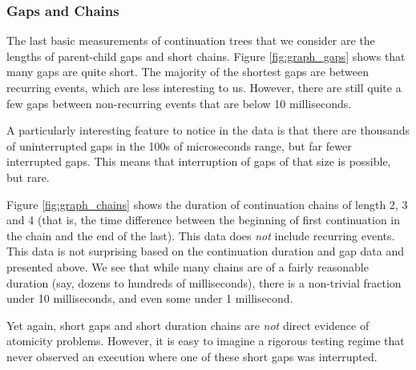 \documentclass[acmsmall,anonymous,review]{acmart}\settopmatter{printfolios=true,printccs=false,printacmref=false}
\begin{document}
\subsubsection{Gaps and Chains}

The last basic measurements of continuation trees that we consider are the lengths of parent-child gaps and short chains.
Figure \ref{fig:graph_gaps} shows that many gaps are quite short.
The majority of the shortest gaps are between recurring events, which are less interesting to us.
However, there are still quite a few gaps between non-recurring events that are below 10 milliseconds.

A particularly interesting feature to notice in the data is that there are thousands of uninterrupted gaps in the 100s of microseconds range, but far fewer interrupted gaps.
This means that interruption of gaps of that size is possible, but rare.

Figure \ref{fig:graph_chains} shows the duration of continuation chains of length 2, 3 and 4 (that is, the time difference between the beginning of first continuation in the chain and the end of the last).
This data does \emph{not} include recurring events.
This data is not surprising based on the continuation duration and gap data and presented above.
We see that while many chains are of a fairly reasonable duration (say, dozens to hundreds of milliseconds), there is a non-trivial fraction under 10 milliseconds, and even some under 1 millisecond.

Yet again, short gaps and short duration chains are \emph{not} direct evidence of atomicity problems.
However, it is easy to imagine a rigorous testing regime that never observed an execution where one of these short gaps was interrupted.
\end{document}
